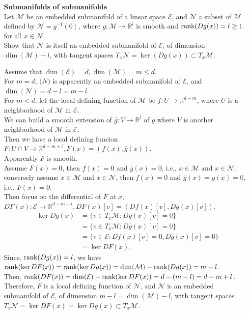 \documentclass[en, oneside]{assignment}
\begin{document}
\begin{prob} \textbf{Submanifolds of submanifolds}\\
    Let $\mathcal{M}$ be an embedded submanifold of a linear space $\mathcal{E}$, 
    and $\mathcal{N}$ a subset of $\mathcal{M}$ defined by $\mathcal{N} = g^{-1}(0)$, where $g: \mathcal{M} \to \mathbb{R}^l$ is smooth 
    and $\operatorname{rank}(Dg(x)) = l \geq 1$ for all $x \in \mathcal{N}$.\\
    Show that $\mathcal{N}$ is itself an embedded submanifold of $\mathcal{E}$, of dimension $\dim(\mathcal{M}) - l$, 
    with tangent spaces $T_x\mathcal{N} = \ker(Dg(x)) \subset T_x\mathcal{M}$.
\end{prob}

\begin{sol}
    Assume that $\dim(\mathcal{E}) = d, \dim(\mathcal{M}) = m \leq d$.\\
    For $m = d$, $\mathcal(N)$ is apparently an embedded submanifold of $\mathcal{E}$, and $\dim(\mathcal{N}) = d - l = m - l$.\\
    For $m < d$, let the local defining function of $\mathcal{M}$ be $f: U \to \mathbb{R}^{d-m}$, where $U$ is a neighborhood of $\mathcal{M}$ in $\mathcal{E}$.\\
    We can build a smooth extension of $\bar{g}: V \to \mathbb{R}^l$ of $g$ where $V$ is another neighborhood of $\mathcal{M}$ in $\mathcal{E}$.\\
    Then we have a local defining funcion $F: U \cap V \to \mathbb{R}^{d-m+l}, F(x) = (f(x), \bar{g}(x))$.\\
    Apparently $F$ is smooth.\\
    Assume $F(x) = 0$,  then $f(x) = 0$ and $\bar{g}(x) = 0$, i.e., $x \in \mathcal{M}$ and $x \in \mathcal{N}$; 
    conversely assume $x \in \mathcal{M}$ and $x \in \mathcal{N}$, then $f(x) = 0$ and $\bar{g}(x) = g(x) = 0$, i.e., $F(x) = 0$.\\
    Then focus on the differential of $F$ at $x$, $DF(x): \mathcal{E} \to \mathbb{R}^{d-m+l}, DF(x)[v] = (Df(x)[v], D\bar{g}(x)[v])$.\\
    \begin{align*}
        \ker Dg(x) & = \{v \in T_x\mathcal{M}: Dg(x)[v] = 0\}\\
        & = \{v \in T_x\mathcal{M}: D\bar{g}(x)[v] = 0\}\\
        & = \{v \in \mathcal{E}: Df(x)[v] = 0, D\bar{g}(x)[v] = 0\}\\
        & = \ker DF(x).
    \end{align*}
    Since, $\operatorname{rank}(Dg(x)) = l$, we have $\operatorname{rank}(\ker DF(x)) = \operatorname{rank}(\ker Dg(x)) = \dim(\mathcal{M}) - \operatorname{rank}(Dg(x)) = m - l$.\\
    Then, $\operatorname{rank}(DF(x)) = \dim(\mathcal{E}) - \operatorname{rank}(\ker DF(x)) = d - (m - l) = d - m + l$.\\
    Therefore, $F$ is a local defining function of $\mathcal{N}$, 
    and $\mathcal{N}$ is an embedded submanifold of $\mathcal{E}$, of dimension $m - l = \dim(\mathcal{M}) - l$, 
    with tangent spaces $T_x\mathcal{N} = \ker DF(x) = \ker Dg(x) \subset T_x\mathcal{M}$.
\end{sol}
\end{document}
